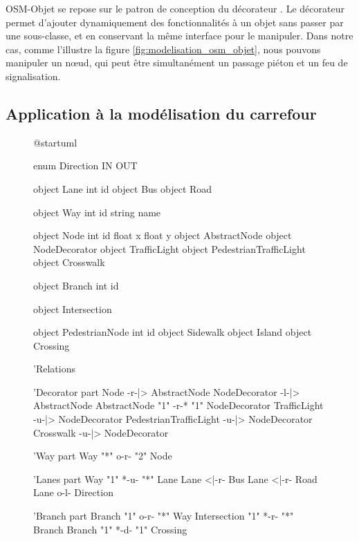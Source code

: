 \newpar{}

OSM-Objet se repose sur le patron de conception du décorateur \citep{Gamma1994a}. Le décorateur permet d'ajouter dynamiquement des fonctionnalités à un objet sans passer par une sous-classe, et en conservant la même interface pour le manipuler. Dans notre cas, comme l'illustre la figure \ref{fig:modelisation_osm_objet}, nous pouvons manipuler un nœud, qui peut être simultanément un passage piéton et un feu de signalisation.

\subsection{Application à la modélisation du carrefour}

\begin{figure}[ht]
    \centering
    \begin{plantuml}
        @startuml

        enum Direction {
            IN
            OUT
        }

        object Lane {
            int id
        }
        object Bus
        object Road

        object Way {
            int id
            string name
        }

        object Node {
            int id
            float x
            float y
        }
        object AbstractNode
        object NodeDecorator
        object TrafficLight
        object PedestrianTrafficLight
        object Crosswalk

        object Branch {
            int id
        }

        object Intersection

        object PedestrianNode {
            int id
        }
        object Sidewalk
        object Island
        object Crossing

        'Relations

        'Decorator part
        Node -r-|> AbstractNode
        NodeDecorator -l-|> AbstractNode
        AbstractNode "1" -r-* "1" NodeDecorator
        TrafficLight -u-|> NodeDecorator
        PedestrianTrafficLight -u-|> NodeDecorator
        Crosswalk -u-|> NodeDecorator

        'Way part
        Way "*" o-r- "2" Node

        'Lanes part
        Way "1" *-u- "*" Lane
        Lane <|-r- Bus
        Lane <|-r- Road
        Lane o-l- Direction

        'Branch part
        Branch "1" o-r- "*" Way
        Intersection "1" *-r- "*" Branch
        Branch "1" *-d- "1" Crossing


\end{plantuml}
\end{figure}
